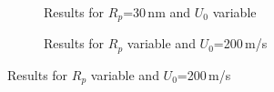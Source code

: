 \begin{figure}[h]
            \begin{subfigure}{0.49\textwidth}
                  \flushleft
                  \caption{Results for $R_{p}$=30\,nm and $U_{0}$ variable}\label{subfig:tw_constBC_U0_var}
          \end{subfigure}\hfill
        \begin{subfigure}{0.49\textwidth}
                \flushright
                \caption{Results for $R_{p}$ variable and $U_{0}$=200\,\textmu m/s}\label{subfig:tw_constBC_Rp_var}

\end{subfigure}
\end{figure}
